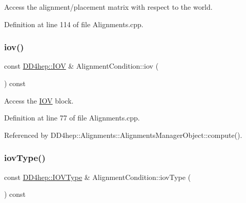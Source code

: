 Access the alignment/placement matrix with respect to the world. 



Definition at line 114 of file Alignments.\+cpp.

\hypertarget{class_d_d4hep_1_1_alignments_1_1_alignment_condition_a8807f4f0108dd9214494521ffe195cc2}{}\label{class_d_d4hep_1_1_alignments_1_1_alignment_condition_a8807f4f0108dd9214494521ffe195cc2} 
\subsubsection{\texorpdfstring{iov()}{iov()}}
{\footnotesize\ttfamily const \hyperlink{class_d_d4hep_1_1_i_o_v}{D\+D4hep\+::\+I\+OV} \& Alignment\+Condition\+::iov (\begin{DoxyParamCaption}{ }\end{DoxyParamCaption}) const}



Access the \hyperlink{class_d_d4hep_1_1_i_o_v}{I\+OV} block. 



Definition at line 77 of file Alignments.\+cpp.



Referenced by D\+D4hep\+::\+Alignments\+::\+Alignments\+Manager\+Object\+::compute().

\hypertarget{class_d_d4hep_1_1_alignments_1_1_alignment_condition_ae50810ce4ba3293820a6796e8e531d1a}{}\label{class_d_d4hep_1_1_alignments_1_1_alignment_condition_ae50810ce4ba3293820a6796e8e531d1a} 
\subsubsection{\texorpdfstring{iov\+Type()}{iovType()}}
{\footnotesize\ttfamily const \hyperlink{class_d_d4hep_1_1_i_o_v_type}{D\+D4hep\+::\+I\+O\+V\+Type} \& Alignment\+Condition\+::iov\+Type (\begin{DoxyParamCaption}{ }\end{DoxyParamCaption}) const}



